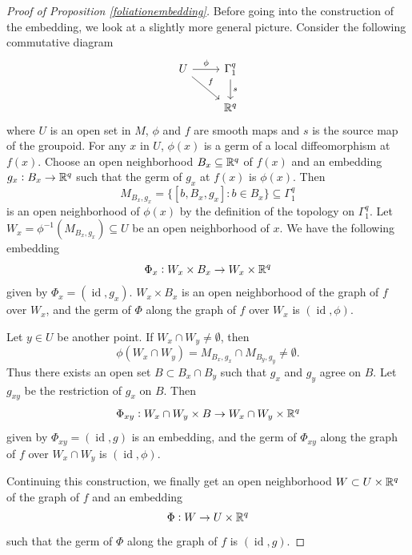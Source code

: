 \documentclass{article}
\newtheorem{proposed work}[theorem]{Proposed Work}
\theoremstyle{definition}
\begin{document}
\begin{proof}[Proof of Proposition \ref{foliationembedding}]
Before going into the construction of the embedding, we look at a
slightly more general picture. Consider the following commutative
diagram
\begin{equation*}
\begin{tikzcd}
U \ar[r,"\phi"] \ar[rd,"f"] & \Gamma^q_1 \ar[d,"s"] \\
& \R^q
\end{tikzcd}
\end{equation*}
where $U$ is an open set in $M$, $\phi$ and $f$ are smooth maps and
$s$ is the source map of the groupoid. For any $x$ in $U$, $\phi(x)$
is a germ of a local diffeomorphism at $f(x)$. Choose an open
neighborhood $B_x \subseteq \mathbb R^q$ of $f(x)$ and an embedding
$g_x: B_x \to \mathbb R^q$ such that the germ of $g_x$ at $f(x)$ is
$\phi(x)$. Then
\begin{equation*}
M_{B_x,g_x} = \{ [b, B_x, g_x] : b \in B_x\} \subseteq \Gamma^q_1
\end{equation*}
is an open neighborhood of $\phi(x)$ by the definition of the topology
on $\Gamma^q_1$. Let $W_x = \phi^{-1}(M_{B_x,g_x}) \subseteq U$ be an
open neighborhood of $x$. We have the following embedding
\begin{equation*}
\Phi_x: W_x \times B_x \to W_x \times \mathbb R^q
\end{equation*}
given by $\Phi_x = (\operatorname{id}, g_x)$. $W_x \times B_x$ is an
open neighborhood of the graph of $f$ over $W_x$, and the germ of
$\Phi$ along the graph of $f$ over $W_x$ is
$(\operatorname{id},\phi)$.

Let $y \in U$ be another point. If $W_x \cap W_y \ne \emptyset$, then
\begin{equation*}
\phi(W_x \cap W_y) = M_{B_x,g_x} \cap M_{B_y,g_y} \ne \emptyset.
\end{equation*}
Thus there exists an open set $B \subset B_x \cap B_y$ such that $g_x$
and $g_y$ agree on $B$. Let $g_{xy}$ be the restriction of $g_x$ on $B$. Then
\begin{equation*}
\Phi_{xy}: W_x \cap W_y \times B \to W_x \cap W_y \times \mathbb R^q
\end{equation*}
given by $\Phi_{xy} = (\operatorname{id}, g)$ is an embedding, and the
germ of $\Phi_{xy}$ along the graph of $f$ over $W_x \cap W_y$ is
$(\operatorname{id}, \phi)$.

Continuing this construction, we finally get an open neighborhood
$W \subset U\times \mathbb R^q$ of the graph of $f$ and an embedding
\begin{equation*}
\Phi: W \to U \times \mathbb R^q
\end{equation*}
such that the germ of $\Phi$ along the graph of $f$ is
$(\operatorname{id},g)$.


\end{proof}
\end{document}
